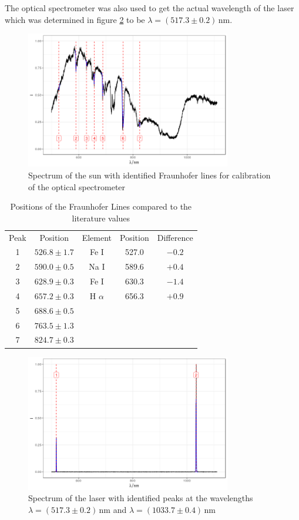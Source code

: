 The optical spectrometer was also used to get the actual wavelength of the laser which was determined in figure \ref{fig:laserspectrum} to be $\lambda=(517.3\pm0.2)\,\mathrm{nm}$.
\begin{figure}
	\centering
	\includegraphics[width=0.8\textwidth]{../figures/sunspectrum.png}
	\caption[Spectrum of the sun with identified Fraunhofer lines]{Spectrum of the sun with identified Fraunhofer lines for calibration of the optical spectrometer}
	\label{fig:sunspectrum}
\end{figure}

\begin{table}
	\centering
	\begin{tabular}{c|c|c|c|c}
		Peak&Position&Element&Position \cite{fraunhoferlines}&Difference\\
		1&$526.8\pm1.7$&Fe I&527.0&$-0.2$\\
		2&$590.0\pm0.5$&Na I&589.6&$+0.4$\\
		3&$628.9\pm0.3$&Fe I&630.3&$-1.4$\\
		4&$657.2\pm0.3$&H $\alpha$&656.3&$+0.9$\\
		5&$688.6\pm0.5$&&&\\
		6&$763.5\pm1.3$&&&\\
		7&$824.7\pm0.3$&&&\\
	\end{tabular}
	\caption{Positions of the Fraunhofer Lines compared to the literature values}
	\label{tab:fraunhofer}
\end{table}

\begin{figure}
	\centering
	\includegraphics[width=0.8\textwidth]{../figures/laserspectrum.png}
	\caption[Spectrum of the laser]{Spectrum of the laser with identified peaks at the wavelengths $\lambda=(517.3\pm0.2)\,\mathrm{nm}$ and $\lambda=(1033.7\pm0.4)\,\mathrm{nm}$}
	\label{fig:laserspectrum}
\end{figure}

